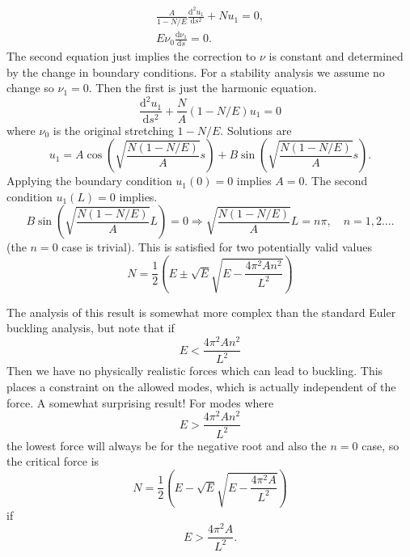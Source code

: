 \documentclass[]{article}
\newcommand{\rmd}{\mathrm{d}}
\newcommand{\deriv}[2]{\frac{\rmd#1}{\rmd #2}}
\newcommand{\derivn}[3]{\frac{\rmd^{#3} #1}{\rmd #2^{#3}}}
\begin{document}
\begin{enumerate}[label=(\alph*)]
{\begin{align}
\frac{A}{1-N/E}\derivn{u_1}{s}{2}+N u_1 =0,\\
E\nu_0\deriv{\nu_1}{s}=0.
\end{align}
The second equation just implies the correction to $\nu$ is constant and determined by the change in boundary conditions. For a stability analysis we assume no change so $\nu_1=0$. Then the first is just the harmonic equation.
\begin{equation}
\derivn{u_1}{s}{2}+\frac{N}{A}(1-N/E) u_1 =0
\end{equation}
where $\nu_0$ is the original stretching $1-N/E$. Solutions are 
\begin{equation}
u_1 = A\cos\left(\sqrt{\frac{N(1-N/E)}{A}}s\right) + B\sin\left(\sqrt{\frac{N(1-N/E)}{A}} s\right).
\end{equation}
Applying the boundary condition $u_1(0) =0 $ implies $A=0$. The second condition $u_1(L)=0$ implies. 
\begin{equation}
B\sin\left(\sqrt{\frac{N(1-N/E)}{A}}L\right)= 0 \Rightarrow \sqrt{\frac{N(1-N/E)}{A}}L =  n\pi,\quad n=1,2 \dots.
\end{equation}
(the $n=0$ case is trivial).  This is satisfied for two potentially valid values
\begin{equation}
N =\frac{1}{2} \left(E \pm \sqrt{E}\sqrt{E-\frac{4 \pi ^2 A n^2}{L^2}} \right)
\end{equation} 

The analysis of this result is somewhat more complex than the standard Euler buckling analysis, but note that if 
\begin{equation}
E<\frac{4 \pi ^2 A n^2}{L^2}
\end{equation}
Then we have no physically realistic forces which can lead to buckling. This places a constraint on the allowed modes, which is actually independent of the force. A somewhat surprising result! For modes where 
\begin{equation}
E>\frac{4 \pi ^2 A n^2}{L^2}
\end{equation}
the lowest force will always be for the negative root and also the $n=0$ case, so the critical force is 
\begin{equation}
N =\frac{1}{2} \left(E - \sqrt{E}\sqrt{E-\frac{4 \pi ^2 A}{L^2}} \right)
\end{equation} 
if 
\begin{equation}
E>\frac{4 \pi ^2 A}{L^2}.
\end{equation}
}
\end{enumerate}
\end{document}
